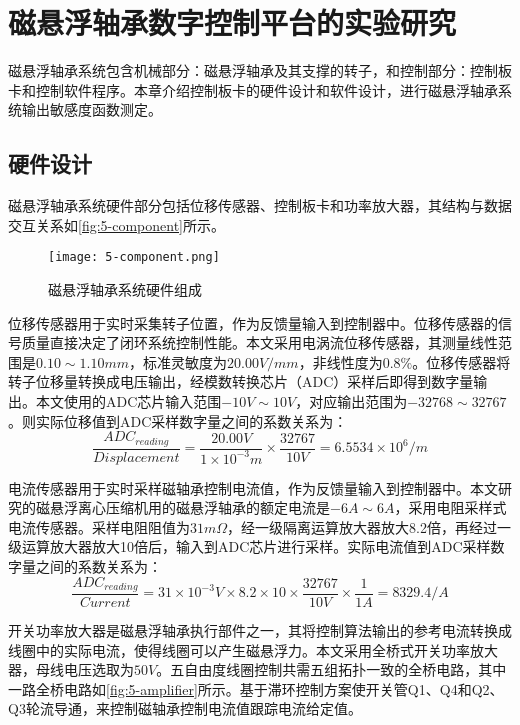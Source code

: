 \documentclass[
  lang=cn,
  degree=master,
  openany,oneside
]{nuaathesis}
\begin{document}
\chapter{磁悬浮轴承数字控制平台的实验研究}
磁悬浮轴承系统包含机械部分：磁悬浮轴承及其支撑的转子，和控制部分：控制板卡和控制软件程序。本章介绍控制板卡的硬件设计和软件设计，进行磁悬浮轴承系统输出敏感度函数测定。

\section{硬件设计}
磁悬浮轴承系统硬件部分包括位移传感器、控制板卡和功率放大器，其结构与数据交互关系如\autoref{fig:5-component}所示。

\begin{figure}[h!]
	\texttt{[image: 5-component.png]}
	\caption{磁悬浮轴承系统硬件组成}
	\label{fig:5-component}
\end{figure}

位移传感器用于实时采集转子位置，作为反馈量输入到控制器中。位移传感器的信号质量直接决定了闭环系统控制性能。本文采用电涡流位移传感器，其测量线性范围是$0.10 \sim 1.10mm$，标准灵敏度为$20.00V/mm$，非线性度为$0.8\%$。位移传感器将转子位移量转换成电压输出，经模数转换芯片（ADC）采样后即得到数字量输出。本文使用的ADC芯片输入范围$-10V \sim 10V$，对应输出范围为$-32768 \sim 32767$。则实际位移值到ADC采样数字量之间的系数关系为：
\begin{equation}
\frac{ADC_{reading}}{Displacement} = \frac{20.00V}{1 \times 10^{-3}m} \times \frac{32767}{10V} = 6.5534 \times 10^6/m
\end{equation}

电流传感器用于实时采样磁轴承控制电流值，作为反馈量输入到控制器中。本文研究的磁悬浮离心压缩机用的磁悬浮轴承的额定电流是$-6A\sim 6A$，采用电阻采样式电流传感器。采样电阻阻值为$31m\Omega$，经一级隔离运算放大器放大8.2倍，再经过一级运算放大器放大10倍后，输入到ADC芯片进行采样。实际电流值到ADC采样数字量之间的系数关系为：
\begin{equation}
\frac{ADC_{reading}}{Current} = 31 \times 10^{-3}V \times 8.2 \times 10 \times \frac{32767}{10V} \times \frac{1}{1A} = 8329.4/A
\end{equation}

开关功率放大器是磁悬浮轴承执行部件之一，其将控制算法输出的参考电流转换成线圈中的实际电流，使得线圈可以产生磁悬浮力。本文采用全桥式开关功率放大器，母线电压选取为$50V$。五自由度线圈控制共需五组拓扑一致的全桥电路，其中一路全桥电路如\autoref{fig:5-amplifier}所示。基于滞环控制方案使开关管Q1、Q4和Q2、Q3轮流导通，来控制磁轴承控制电流值跟踪电流给定值。
\end{document}
